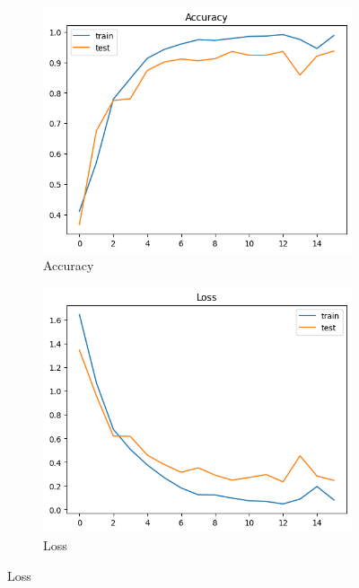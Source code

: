 \documentclass[12pt,oneside,openright,a4paper]{cpe-thai-project}
\begin{document}
\begin{itemize}
      \begin{figure}[!ht]\centering
        \begin{subfigure}{0.49\textwidth}
          \includegraphics[width=\linewidth]{./img/lstm_thai_acc.png} 
          \caption{Accuracy}
          \label{fig:lstm_thai_acc}
        \end{subfigure}
        \begin{subfigure}{0.49\textwidth}
          \includegraphics[width=\linewidth]{./img/lstm_thai_loss.png}
          \caption{Loss}
          \label{fig:lstm_thai_loss}
        \end{subfigure}

\end{figure}
\end{itemize}
\end{document}
